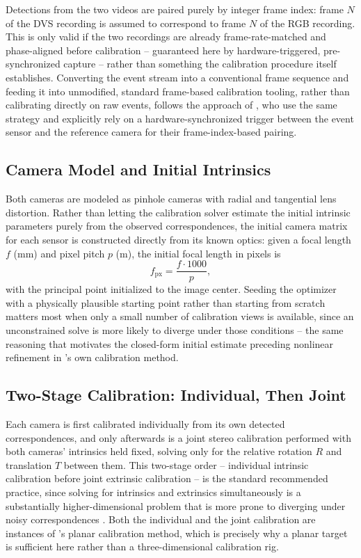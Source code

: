 Detections from the two videos are paired purely by integer frame index:
frame $N$ of the DVS recording is assumed to correspond to frame $N$ of the
RGB recording. This is only valid if the two recordings are already
frame-rate-matched and phase-aligned before calibration -- guaranteed here
by hardware-triggered, pre-synchronized capture -- rather than something the
calibration procedure itself establishes. Converting the event stream into a
conventional frame sequence and feeding it into unmodified, standard
frame-based calibration tooling, rather than calibrating directly on raw
events, follows the approach of \textcite{muglikar_how_2021}, who use the same
strategy and explicitly rely on a hardware-synchronized trigger between the
event sensor and the reference camera for their frame-index-based pairing.

\subsection{Camera Model and Initial Intrinsics}

Both cameras are modeled as pinhole cameras with radial and tangential lens
distortion. Rather than letting the calibration solver estimate the initial
intrinsic parameters purely from the observed correspondences, the initial
camera matrix for each sensor is constructed directly from its known optics:
given a focal length $f$ (mm) and pixel pitch $p$ (\textmu m), the initial
focal length in pixels is
\begin{equation}
    f_\text{px} = \frac{f \cdot 1000}{p},
\end{equation}
with the principal point initialized to the image center. Seeding the
optimizer with a physically plausible starting point rather than starting
from scratch matters most when only a small number of calibration views is
available, since an unconstrained solve is more likely to diverge under
those conditions -- the same reasoning that motivates the closed-form
initial estimate preceding nonlinear refinement in \textcite{zhang2000}'s
own calibration method.

\subsection{Two-Stage Calibration: Individual, Then Joint}

Each camera is first calibrated individually from its own detected
correspondences, and only afterwards is a joint stereo calibration performed
with both cameras' intrinsics held fixed, solving only for the relative
rotation $R$ and translation $T$ between them. This two-stage order --
individual intrinsic calibration before joint extrinsic calibration -- is
the standard recommended practice, since solving for intrinsics and
extrinsics simultaneously is a substantially higher-dimensional problem that
is more prone to diverging under noisy correspondences
\parencite{opencv_calib3d_docs}. Both the individual and the joint
calibration are instances of \textcite{zhang2000}'s planar calibration
method, which is precisely why a planar target is sufficient here rather
than a three-dimensional calibration rig.

